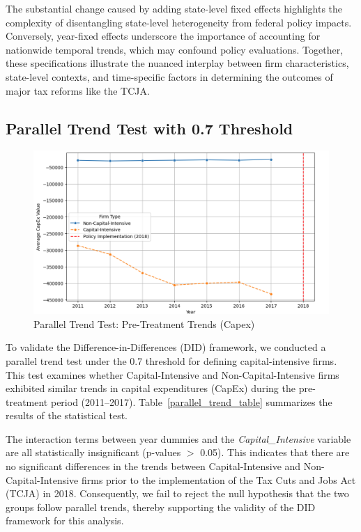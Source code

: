 \documentclass[11pt]{article}
\begin{document}
The substantial change caused by adding state-level fixed effects highlights the complexity of disentangling state-level heterogeneity from federal policy impacts. Conversely, year-fixed effects underscore the importance of accounting for nationwide temporal trends, which may confound policy evaluations. Together, these specifications illustrate the nuanced interplay between firm characteristics, state-level contexts, and time-specific factors in determining the outcomes of major tax reforms like the TCJA.

\subsection{Parallel Trend Test with 0.7 Threshold}
\begin{figure}
    \centering
    \includegraphics[width=0.75\linewidth]{b92854fdb34d09b5d1f490875bbc444.png}
    \caption{Parallel Trend Test: Pre-Treatment Trends (Capex)}
\end{figure}

To validate the Difference-in-Differences (DID) framework, we conducted a parallel trend test under the 0.7 threshold for defining capital-intensive firms. This test examines whether Capital-Intensive and Non-Capital-Intensive firms exhibited similar trends in capital expenditures (CapEx) during the pre-treatment period (2011–2017). Table~\ref{parallel_trend_table} summarizes the results of the statistical test.

The interaction terms between year dummies and the \textit{Capital\_Intensive} variable are all statistically insignificant (p-values $>$ 0.05). This indicates that there are no significant differences in the trends between Capital-Intensive and Non-Capital-Intensive firms prior to the implementation of the Tax Cuts and Jobs Act (TCJA) in 2018. Consequently, we fail to reject the null hypothesis that the two groups follow parallel trends, thereby supporting the validity of the DID framework for this analysis.
\end{document}
